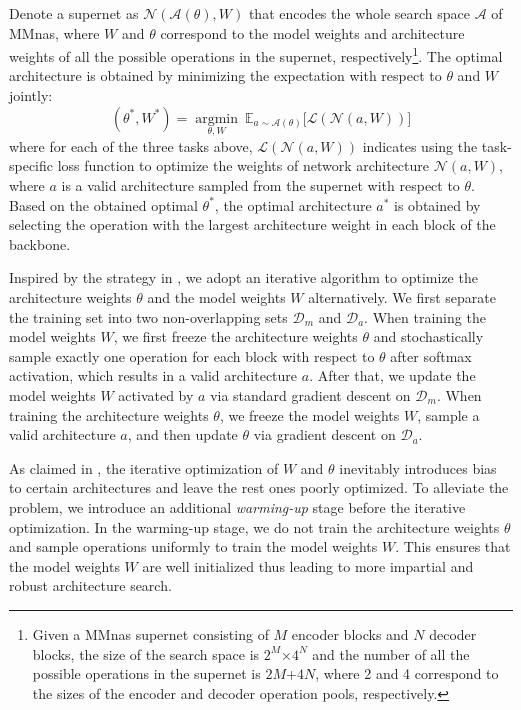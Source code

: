 \documentclass[sigconf]{acmart}
\begin{document}
Denote a supernet as $\mathcal{N}(\mathcal{A}(\theta), W)$ that encodes the whole search space $\mathcal{A}$ of MMnas, where $W$ and $\theta$ correspond to the model weights and architecture weights of all the possible operations in the supernet, respectively\footnote{Given a MMnas supernet consisting of $M$ encoder blocks and $N $ decoder blocks,  the size of the search space is $2^M$$\times$$4^N$ and the number of all the possible operations in the supernet is $2M$+$4N$, where 2 and 4 correspond to the sizes of the encoder and decoder operation pools, respectively.}. The optimal architecture is obtained by minimizing the expectation with respect to $\theta$ and $W$ jointly:
\begin{equation}\label{eq:nas1}
(\theta^*, W^*) = \mathop{\mathrm{argmin}}\limits_{\theta, W} ~\mathbb{E}_{a\sim\mathcal{A}(\theta)}[\mathcal{L}{\left(\mathcal{N}(a, W)\right)]}
\end{equation}
where for each of the three tasks above, $\mathcal{L}(\mathcal{N}(a,W))$ indicates using the task-specific loss function to optimize the weights of network architecture $\mathcal{N}(a,W)$, where $a$ is a valid architecture sampled from the supernet with respect to $\theta$. Based on the obtained optimal $\theta^*$, the optimal architecture $a^*$ is obtained by selecting the operation with the largest architecture weight in each block of the backbone.

Inspired by the strategy in \cite{cai2018proxylessnas}, we adopt an iterative algorithm to optimize the architecture weights $\theta$ and the model weights $W$ alternatively. We first separate the training set into two non-overlapping sets $\mathcal{D}_m$ and $\mathcal{D}_a$. When training the model weights $W$, we first freeze the architecture weights $\theta$ and stochastically sample exactly one operation for each block with respect to $\theta$ after softmax activation, which results in a valid architecture $a$. After that, we update the model weights $W$ activated by $a$ via standard gradient descent on $\mathcal{D}_m$. When training the architecture weights $\theta$, we freeze the model weights $W$, sample a valid architecture $a$, and then update $\theta$ via gradient descent on $\mathcal{D}_a$.

As claimed in \cite{chu2019fairnas}, the iterative optimization of $W$ and $\theta$ inevitably introduces bias to certain architectures and leave the rest ones poorly optimized. To alleviate the problem, we introduce an additional \emph{warming-up} stage before the iterative optimization. In the warming-up stage, we do not train the architecture weights $\theta$ and sample operations uniformly to train the model weights $W$. This ensures that the model weights $W$ are well initialized thus leading to more impartial and robust architecture search.
\end{document}
